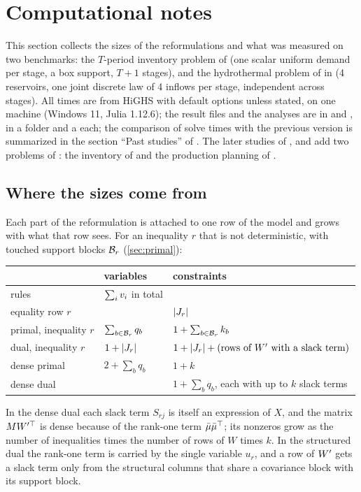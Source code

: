 \section{Computational notes}
\label{sec:computation}

This section collects the sizes of the reformulations and what was measured on two benchmarks:
the $T$-period inventory problem of  (one scalar uniform demand per stage, a box support, $T+1$ stages),
and the hydrothermal problem of \citet{ShapiroEtAl2013} in  (4 reservoirs, one joint discrete law of 4 inflows per stage, independent across stages).
All times are from HiGHS \citep{HuangfuHall2018} with default options unless stated, on one machine (Windows 11, Julia 1.12.6);
the result files and the analyses are in  and , in a folder  and a  each;
the comparison of solve times with the previous version is summarized in the section ``Past studies'' of .
The later studies of ,  and  add two problems of :
the inventory of \citet[Section~5]{KWG2011} and the production planning of \citet[Section~6.1]{GKW2019}.

\subsection{Where the sizes come from}

Each part of the reformulation is attached to one row of the model and grows with what that row sees.
For an inequality $r$ that is not deterministic, with touched support blocks $\mathcal{B}_r$ (\cref{sec:primal}):
\begin{center}
\begin{tabular}{lll}
\toprule
& variables & constraints \\
\midrule
rules & $\sum_i v_i$ in total & \\
equality row $r$ & & $\lvert J_r \rvert$ \\
primal, inequality $r$ & $\sum_{b\in\mathcal{B}_r} q_b$ & $1 + \sum_{b\in\mathcal{B}_r} k_b$ \\
dual, inequality $r$ & $1 + \lvert J_r \rvert$ & $1 + \lvert J_r \rvert + (\text{rows of } W' \text{ with a slack term})$ \\
dense primal \citep[(4.2)]{KWG2011} & $2 + \sum_b q_b$ & $1 + k$ \\
dense dual \citep[(4.6)]{KWG2011} & & $1 + \sum_b q_b$, each with up to $k$ slack terms \\
\bottomrule
\end{tabular}
\end{center}
In the dense dual each slack term $S_{rj}$ is itself an expression of $X$, and the matrix $MW'^\top$ is dense because of the rank-one term $\bar\mu\bar\mu^\top$;
its nonzeros grow as the number of inequalities times the number of rows of $W$ times $k$.
In the structured dual the rank-one term is carried by the single variable $u_r$,
and a row of $W'$ gets a slack term only from the structural columns that share a covariance block with its support block.

